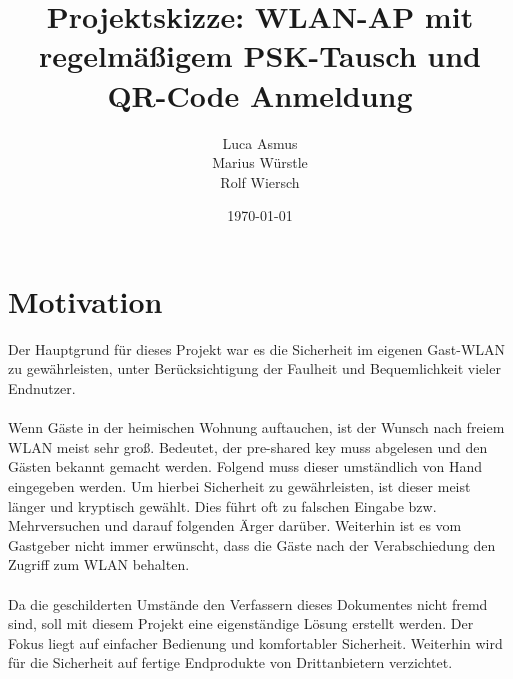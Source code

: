 \documentclass[a4paper,11pt,singlespacing]{article}
\begin{document}
	\setlength{\parindent}{0ex}
	\begin{titlepage}

        \author{Luca Asmus\\ Marius Würstle\\Rolf Wiersch}
        \title{Projektskizze: WLAN-AP mit regelmäßigem PSK-Tausch und QR-Code Anmeldung \vspace{10cm}}
        \date{\today}
	    \maketitle
        \thispagestyle{empty}
    \end{titlepage}
	
	\section{Motivation}
	Der Hauptgrund für dieses Projekt war es die Sicherheit im eigenen Gast-WLAN zu gewährleisten, unter Berücksichtigung der Faulheit und Bequemlichkeit vieler Endnutzer. \\ \\
	Wenn Gäste in der heimischen Wohnung auftauchen, ist der Wunsch nach freiem WLAN meist sehr groß. Bedeutet, der pre-shared key muss abgelesen und den Gästen bekannt gemacht werden. Folgend muss dieser umständlich von Hand eingegeben werden. Um hierbei Sicherheit zu gewährleisten, ist dieser meist länger und kryptisch gewählt. Dies führt oft zu falschen Eingabe bzw. Mehrversuchen und darauf folgenden Ärger darüber. Weiterhin ist es vom Gastgeber nicht immer erwünscht, dass die Gäste nach der Verabschiedung den Zugriff zum WLAN behalten. \\ \\
	Da die geschilderten Umstände den Verfassern dieses Dokumentes nicht fremd sind, soll mit diesem Projekt eine eigenständige Lösung erstellt werden. Der Fokus liegt auf einfacher Bedienung und komfortabler Sicherheit. Weiterhin wird für die Sicherheit auf fertige Endprodukte von Drittanbietern verzichtet. 
	
	
\end{document}
